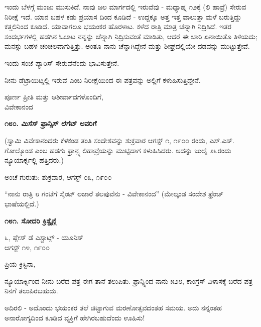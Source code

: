 ಇಂದು ಬೆಳಗ್ಗೆ ಮಂಜು ಮುಸುಕಿದೆ. ನಾವು ಜಲ ಮಾರ್ಗದಲ್ಲಿ ಇರುವೆವು - ಮಧ್ಯಾಹ್ನ ೧೨ಕ್ಕೆ (ಲಿ ಹಾವ್ರೆ) ಸೇರುವ ನಿರೀಕ್ಷೆ ಇದೆ. ಯಾನ ಬಹಳ ಕಡು ಪ್ರಯಾಸ ದಿಂದ ಕೂಡಿದೆ - ಉದ್ದಕ್ಕೂ ಅತ್ತ ಇತ್ತ ವಾಲುತ್ತಾ ಮಳೆ ಬರುತ್ತಿದ್ದು ಕತ್ತಲಿನಿಂದ ಕೂಡಿದೆ. ಯಾವಾಗಲೂ ಭಯಂಕರ ಹೊರಳಾಟ. ಕಳೆದ ರಾತ್ರಿ ಮಾತ್ರ ಚೆನ್ನಾಗಿ ನಿದ್ರಿಸಿದೆ. ಇತರ ಸಂದರ್ಭಗಳಲ್ಲಿ ಹಡಗಿನ ಓಲಾಟ ನನ್ನನ್ನು ಚೆನ್ನಾಗಿ ನಿದ್ರಿಸುವಂತೆ ಮಾಡಿತು, ಆದರೆ ಈ ಬಾರಿ ಏನಾಯಿತೊ ತಿಳಿಯದು; ಮನಸ್ಸು ಬಹಳ ಚಂಚಲವಾಗುತ್ತಿತ್ತು. ಅಂತೂ ನಾನು ಚೆನ್ನಾಗಿದ್ದೇನೆ ಮತ್ತು ಶೀಘ್ರದಲ್ಲಿಯೇ ದಡವನ್ನು ಮುಟ್ಟುತ್ತೇವೆ.

ಇಂದು ಸಂಜೆ ಪ್ಯಾರಿಸ್ ಸೇರುವೆನೆಂದು ಭಾವಿಸುತ್ತೇನೆ.

ನೀನು ಡೆಟ್ರಾಯಿಟ್ನಲ್ಲಿ ಇರುವೆ ಎಂಬ ನಿರೀಕ್ಷೆಯಿಂದ ಈ ಪತ್ರವನ್ನು ಅಲ್ಲಿಗೆ ಕಳುಹಿಸುತ್ತಿದ್ದೇನೆ.

\begin{flushright}
ಪೂರ್ಣ ಪ್ರೀತಿ ಮತ್ತು ಆಶೀರ್ವಾದಗಳೊಂದಿಗೆ,\\ವಿವೇಕಾನಂದ
\end{flushright}

\begin{center}
\textbf{೧೮೦. ಮಿಸೆಸ್ ಫ್ರಾನ್ಸಿಸ್ ಲೆಗೆಟ್ ಅವರಿಗೆ}
\end{center}

\begin{center}
(ಸ್ವಾಮಿ ವಿವೇಕಾನಂದರು ಕೆಳಕಂಡ ತಂತಿ ಸಂದೇಶವನ್ನು ಶುಕ್ರವಾರ ಆಗಸ್ಟ್ ೧, ೧೯೦೦ ರಂದು, ಎಸ್.ಎಸ್. ಗೋಲ್ಕೊಂಡ ಎಂಬ ಹಡಗು ಫ್ರಾನ್ಸ್ನ ಲಿಹಾವ್ರೆಯನ್ನು ಮುಟ್ಟಿದಾಗ ಕಳುಹಿಸಿದರು. ಅದನ್ನು ಜುಲೈ ೨೬ರಂದು ನ್ಯೂಯಾರ್ಕ್ನಲ್ಲಿ ಹತ್ತಿದರು.)
\end{center}

\begin{flushright}
ಅಂಚೆ ಗುರುತು: ಶುಕ್ರವಾರ, ಆಗಸ್ಟ್ ೦೩, ೧೯೦೦
\end{flushright}

“ನಾನು ರಾತ್ರಿ ೮ ಗಂಟೆಗೆ ಸೈಂಟ್ ಲಜಾರೆ ತಲಪುವೆನು - ವಿವೇಕಾನಂದ” (ಮೇಲ್ಕಂಡ ಸಂದೇಶ ಫ್ರೆಂಚ್ ಭಾಷೆಯಲ್ಲಿದೆ.)

\begin{center}
\textbf{೧೮೧. ಸೋದರಿ ಕ್ರಿಸ್ಟೈನ್ಗೆ}
\end{center}

\begin{flushright}
೬, ಪ್ಲೇಸ್ ಡೆ ಎಸ್ಟಾಟ್ಸ್ - ಯೂನಿಸ್\\ಆಗಸ್ಟ್ ೧೪, ೧೯೦೦
\end{flushright}

ಪ್ರಿಯ ಕ್ರಿಸ್ಟಿನಾ,

ನ್ಯೂಯಾರ್ಕ್ನಿಂದ ನೀನು ಬರೆದ ಪತ್ರ ಈಗ ತಾನೆ ತಲುಪಿತು. ಫ್ರಾನ್ಸ್ನಿಂದ ನಾನು ೫೨೮, ಕಾಂಗ್ರೆಸ್ ವಿಳಾಸಕ್ಕೆ ಬರೆದ ಪತ್ರ ನಿನಗೆ ತಲುಪಿರಬಹುದು.

ಅದಿರಲಿ - ಅದೊಂದು ಭಯಂಕರ ತಲೆ ಚಿಟ್ಟಾಗುವ ಮರಣೋತ್ಸವದಂತಹ ಸಮಯ. ಅದು ನನ್ನಂತಹ ಅನಾರೋಗ್ಯದಿಂದ ಕೂಡಿದ ವ್ಯಕ್ತಿಗೆ ಹೇಗಿರಬಹುದೆಂದು ಊಹಿಸು!

